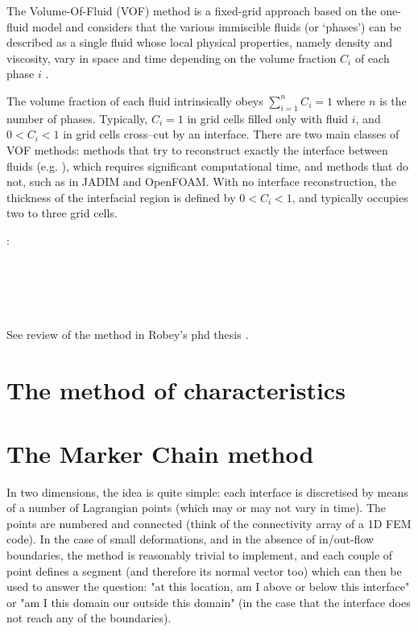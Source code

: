 The Volume-Of-Fluid (VOF) method is a fixed-grid approach based on the one-fluid model and considers that the various immiscible fluids (or `phases') can be described as a single fluid whose local physical properties, namely density and viscosity, vary in space and time depending on the volume fraction $C_i$ of each phase $i$ 
\cite{hini81,youn82}. 

The volume fraction of each fluid intrinsically obeys $\sum \limits_{{i=1}}^n C_i = 1$ where $n$ is the number of phases. 
Typically, $C_i=1$ in grid cells filled only with fluid $i$, and $0<C_i<1$ in grid cells cross--cut by an interface. 
There are two main classes of VOF methods: methods that try to reconstruct exactly the interface between fluids (e.g. \cite{puth18}), which requires significant computational time, and methods that do not, such as in JADIM and OpenFOAM. 
With no interface reconstruction, the thickness of the interfacial region is defined by $0<C_i<1$, and typically occupies two to three grid cells. 

\Literature:\\
\textcite{hini81}\\
\textcite{dusm13}\\
\textcite{ropu19}\\
\textcite{logb20}\\
\textcite{lobg22}\\

See review of the method in Robey's phd thesis \cite{robe19}.

\section{The method of characteristics}


\cite{devv00a}

\section{The Marker Chain method}

In two dimensions, the idea is quite simple: each interface is discretised by means of a number
of Lagrangian points (which may or may not vary in time). The points are numbered and 
connected (think of the connectivity array of a 1D FEM code). In the case of small deformations, 
and in the absence of in/out-flow boundaries, the method is reasonably trivial to implement, and 
each couple of point defines a segment (and therefore its normal vector too) which can then be used
to answer the question: "at this location, am I above or below this interface" or "am I this domain our
outside this domain" (in the case that the interface does not reach any of the boundaries).

